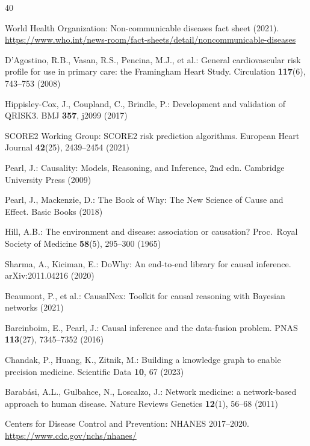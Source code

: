 \documentclass[runningheads]{llncs}
\begin{document}
\begin{thebibliography}{40}

World Health Organization:
Non-communicable diseases fact sheet (2021).
\url{https://www.who.int/news-room/fact-sheets/detail/noncommunicable-diseases}

D'Agostino, R.B., Vasan, R.S., Pencina, M.J., et al.:
General cardiovascular risk profile for use in primary care:
the Framingham Heart Study.
Circulation \textbf{117}(6), 743--753 (2008)

Hippisley-Cox, J., Coupland, C., Brindle, P.:
Development and validation of QRISK3.
BMJ \textbf{357}, j2099 (2017)

SCORE2 Working Group:
SCORE2 risk prediction algorithms.
European Heart Journal \textbf{42}(25), 2439--2454 (2021)

Pearl, J.:
Causality: Models, Reasoning, and Inference, 2nd edn.
Cambridge University Press (2009)

Pearl, J., Mackenzie, D.:
The Book of Why: The New Science of Cause and Effect.
Basic Books (2018)

Hill, A.B.:
The environment and disease: association or causation?
Proc.\ Royal Society of Medicine \textbf{58}(5), 295--300 (1965)

Sharma, A., Kiciman, E.:
DoWhy: An end-to-end library for causal inference.
arXiv:2011.04216 (2020)

Beaumont, P., et al.:
CausalNex: Toolkit for causal reasoning with Bayesian networks (2021)

Bareinboim, E., Pearl, J.:
Causal inference and the data-fusion problem.
PNAS \textbf{113}(27), 7345--7352 (2016)

Chandak, P., Huang, K., Zitnik, M.:
Building a knowledge graph to enable precision medicine.
Scientific Data \textbf{10}, 67 (2023)

Barab\'{a}si, A.L., Gulbahce, N., Loscalzo, J.:
Network medicine: a network-based approach to human disease.
Nature Reviews Genetics \textbf{12}(1), 56--68 (2011)

Centers for Disease Control and Prevention:
NHANES 2017--2020.
\url{https://www.cdc.gov/nchs/nhanes/}


\end{thebibliography}
\end{document}
